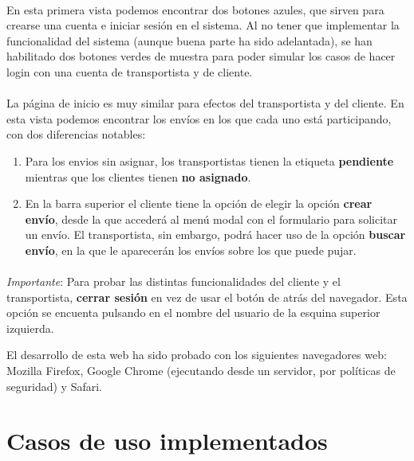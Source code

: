 \documentclass[10pt, a4paper,spanish]{article}
\begin{document}
		\paragraph{}
		En esta primera vista podemos encontrar dos botones azules, que sirven para crearse una cuenta e iniciar sesión en el sistema. Al no tener que implementar la funcionalidad del sistema (aunque buena parte ha sido adelantada), se han habilitado dos botones verdes de muestra para poder simular los casos de hacer login con una cuenta de transportista y de cliente.

		\paragraph{}
		La página de inicio es muy similar para efectos del transportista y del cliente. En esta vista podemos encontrar los envíos en los que cada uno está participando, con dos diferencias notables:

		\begin{enumerate}
				\item Para los envios sin asignar, los transportistas tienen la etiqueta \textbf{pendiente} mientras que los clientes tienen \textbf{no asignado}.
				\item En la barra superior el cliente tiene la opción de elegir la opción \textbf{crear envío}, desde la que accederá al menú modal con el formulario para solicitar un envío. El transportista, sin embargo, podrá hacer uso de la opción \textbf{buscar envío}, en la que le aparecerán los envíos sobre los que puede pujar.
		\end{enumerate}

		\paragraph{}
		\textit{Importante}: Para probar las distintas funcionalidades del cliente y el transportista, \textbf{cerrar sesión} en vez de usar el botón de atrás del navegador. Esta opción se encuenta pulsando en el nombre del usuario de la esquina superior izquierda.

		El desarrollo de esta web ha sido probado con los siguientes navegadores web: Mozilla Firefox, Google Chrome (ejecutando desde un servidor, por políticas de seguridad) y Safari.


	\section{Casos de uso implementados}
\end{document}
